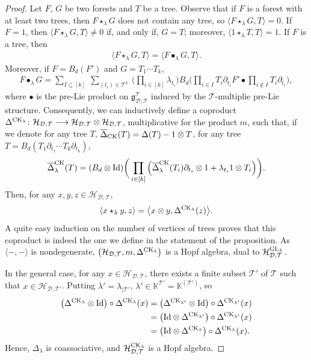 \documentclass[10pt,a4paper]{amsart}
\numberwithin{equation}{section}
\newcommand{\K}{\mathbb{K}}
\newcommand{\T}{\mathcal{T}}
\newcommand{\D}{\mathcal{D}}
\newcommand{\g}{\mathfrak{g}}
\newcommand{\h}{\mathcal{H}}
\newcommand{\id}{\mathrm{Id}}
\begin{document}
\begin{proof}
Let $F$, $G$ be two forests and $T$ be a tree. Observe that if $F$ is a forest with at least two trees,
then $F\star_\lambda G$ does not contain any tree, so $\langle F\star_\lambda G,T\rangle=0$.
If $F=1$, then $\langle F\star_\lambda G,T\rangle\neq 0$ if, and only if, $G=T$; moreover, $\langle 1\star_\lambda T,T\rangle=1$.
If $F$ is a tree, then
\begin{gather*}
\langle F\star_\lambda G,T\rangle=\langle F\bullet_\lambda G,T\rangle.
\end{gather*}
Moreover, if $F=B_d(F')$ and $G=T_1\cdots T_k$,
\begin{gather*}
F\bullet_\lambda G=\sum_{I\subseteq [k]}\: \sum_{(t_i)\in \T^k}\:
\bigg(\prod_{i\in [k]} \lambda_{t_i}\bigg) B_d\bigg(\prod_{i\in I} T_i\partial_{t_i}
F'\bullet \prod_{i\notin I} T_i\partial_{t_i}\bigg),
\end{gather*}
where $\bullet$ is the pre-Lie product on $\g_{\D,\T}^\T$ induced by the $\T$-multiplie pre-Lie structure.
Consequently, we can inductively define a coproduct $\Delta^{{\rm CK}_\lambda}\colon \h_{\D,\T}\longrightarrow
\h_{\D,\T}\otimes \h_{\D,\T}$,
multiplicative for the product $m$, such that, if we denote for any tree $T$,
$\overline{\Delta}_{{\rm CK}}(T)=\Delta(T)-1\otimes T$,
for any tree $T=B_d(T_1\partial_{t_1}\cdots T_k\partial_{t_k})$,
\begin{gather*}
\overline{\Delta}^{{\rm CK}}_\lambda(T)=(B_d\otimes \id)\bigg(\prod_{i\in [k]}
\Big(\overline{\Delta}_\lambda^{{\rm CK}}(T_i)\partial_{t_i}\otimes 1+\lambda_{t_i}1\otimes T_i\Big)\bigg).
\end{gather*}
Then, for any $x,y,z\in \h_{\D,\T}$,
\begin{gather*}
\langle x\star_\lambda y,z\rangle=\big\langle x\otimes y,\Delta^{{\rm CK}_\lambda}(z)\big\rangle.
\end{gather*}
A quite easy induction on the number of vertices of trees proves that this coproduct is indeed
the one we define in the statement of the proposition. As $\langle-,-\rangle$ is nondegenerate,
$\big(\h_{\D,\T},m,\Delta^{{\rm CK}_\lambda}\big)$ is a Hopf algebra, dual to $\h_{\D,\T}^{{\rm GL}_\lambda}$.

In the general case, for any $x\in \h_{\D,\T}$, there exists a finite subset $\T'$ of $\T$ such that
$x\in \h_{\D,\T'}$. Putting $\lambda'=\lambda_{\mid \T'}$, $\lambda'\in \K^{\T'}=\K^{(\T')}$, so
\begin{align*}
\big(\Delta^{{\rm CK}_\lambda}\otimes \id\big)\circ \Delta^{{\rm CK}_\lambda}(x)
&=\big(\Delta^{{\rm CK}_{\lambda'}}\otimes \id\big)\circ \Delta^{{\rm CK}_{\lambda'}}(x)\\
&=\big(\id \otimes \Delta^{{\rm CK}_{\lambda'}}\big)\circ \Delta^{{\rm CK}_{\lambda'}}(x)\\
&=\big(\id \otimes \Delta^{{\rm CK}_\lambda}\big)\circ \Delta^{{\rm CK}_\lambda}(x).
\end{align*}
Hence, $\Delta_\lambda$ is coassociative, and $\h_{\D,\T}^{{\rm CK}_\lambda}$ is a Hopf algebra. \end{proof}
\end{document}
